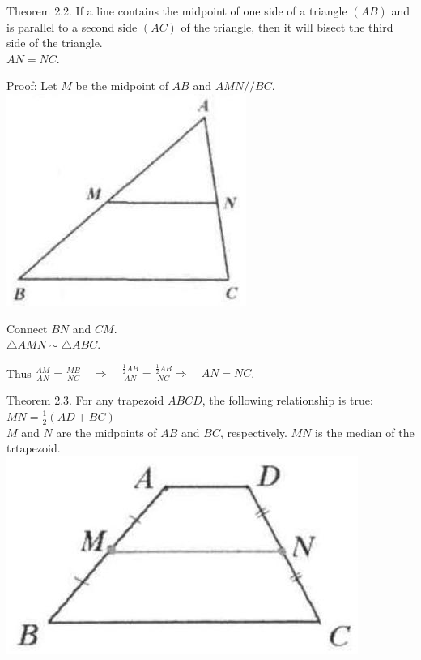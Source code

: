 \documentclass{article}
\begin{document}
Theorem 2.2. If a line contains the midpoint of one side of a triangle \((A B)\) and is parallel to a second side \((A C)\) of the triangle, then it will bisect the third side of the triangle.\\
\(A N=N C\).

Proof:
Let \(M\) be the midpoint of \(A B\) and \(A M N / / B C\).\\
\centering
\includegraphics[width=\textwidth]{images/033(1).jpg}

Connect \(B N\) and \(C M\).\\
\(\triangle A M N \sim \triangle A B C\).


Thus \(\frac{A M}{A N}=\frac{M B}{N C} \quad \Rightarrow \quad \frac{\frac{1}{2} A B}{A N}=\frac{\frac{1}{2} A B}{N C} \Rightarrow \quad A N=N C\).

Theorem 2.3. For any trapezoid \(A B C D\), the following relationship is true:\\
\(M N=\frac{1}{2}(A D+B C)\)\\
\(M\) and \(N\) are the midpoints of \(A B\) and \(B C\), respectively. \(M N\) is the median of the trtapezoid.\\
\centering
\includegraphics[width=\textwidth]{images/034(1).jpg}
\end{document}
